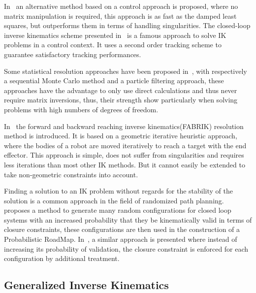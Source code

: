 In~\cite{pechev2008inverse} an alternative method based on a control approach is proposed, where no matrix manipulation is required, this approach is as fast as the damped least squares, but outperforms them in terms of handling singularities.
The closed-loop inverse kinematics scheme presented in~\cite{siciliano1990closed} is a famous approach to solve IK problems in a control context.
It uses a second order tracking scheme to guarantee satisfactory tracking performances.

Some statistical resolution approaches have been proposed in~\cite{courty2008inverse, hecker2008real}, with respectively a sequential Monte Carlo method and a particle filtering approach, these approaches have the advantage to only use direct calculations and thus never require matrix inversions, thus, their strength show particularly when solving problems with high numbers of degrees of freedom.

In~\cite{AristidouFABRIK, Aristidou:2016_ExtFABRIK} the forward and backward reaching inverse kinematics(FABRIK) resolution method is introduced.
It is based on a geometric iterative heuristic approach, where the bodies of a robot are moved iteratively to reach a target with the end effector.
This approach is simple, does not suffer from singularities and requires less iterations than most other IK methods.
But it cannot easily be extended to take non-geometric constraints into account.

Finding a solution to an IK problem without regards for the stability of the solution is a common approach in the field of randomized path planning.
\cite{cortes2002random} proposes a method to generate many random configurations for closed loop systems with an increased probability that they be kinematically valid in terms of closure constraints, these configurations are then used in the construction of a Probabilistic RoadMap. In~\cite{lavalle1999probabilistic}, a similar approach is presented where instead of increasing its probability of validation, the closure constraint is enforced for each configuration by additional treatment.

\subsection{Generalized Inverse Kinematics}
\label{sub:generalized_inverse_kinematics}

